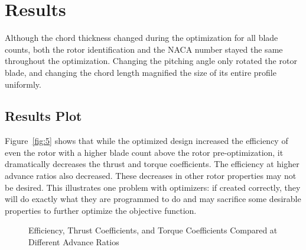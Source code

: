 \documentclass[journal ]{new-aiaa}
\begin{document}
\section{Results}

Although the chord thickness changed during the optimization for all blade counts, both the rotor identification and the NACA number stayed the same throughout the optimization. Changing the pitching angle only rotated the rotor blade, and changing the chord length magnified the size of its entire profile uniformly.

\subsection{Results Plot}

Figure~\eqref{fig:5} shows that while the optimized design increased the efficiency of even the rotor with a higher blade count above the rotor pre-optimization, it dramatically decreases the thrust and torque coefficients. The efficiency at higher advance ratios also decreased. These decreases in other rotor properties may not be desired. This illustrates one problem with optimizers: if created correctly, they will do exactly what they are programmed to do and may sacrifice some desirable properties to further optimize the objective function.

\begin{figure}[H]
\centering

	\hspace{1em}
	\caption{Efficiency, Thrust Coefficients, and Torque Coefficients Compared at Different Advance Ratios}
	\captionsetup{aboveskip=0pt,font=it}
	\label{fig:5}
\end{figure}
\end{document}
